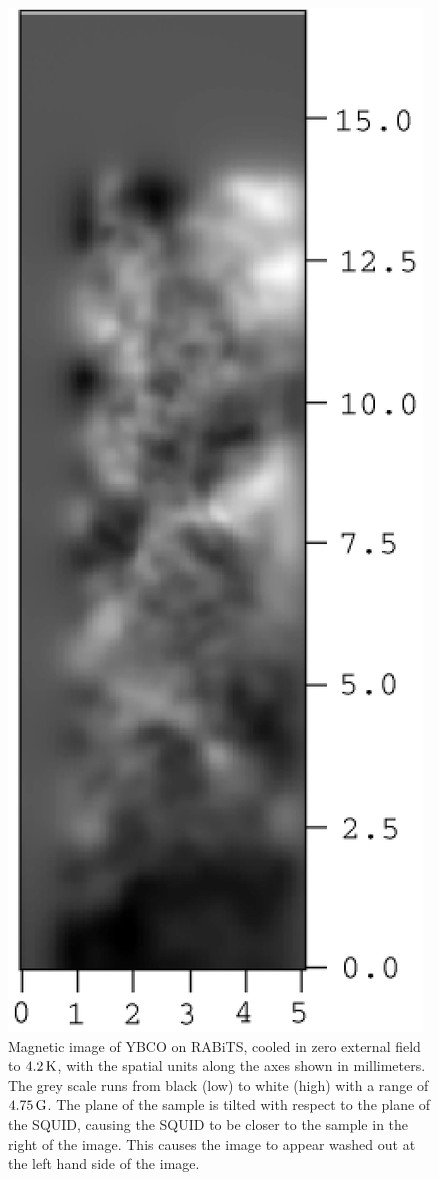 %
%
\begin{figure}[p]
\includegraphics{figs/magpen/fig4.ps}
\caption[Magnetic image of zero field cooled YBCO on RABiTS.]
{Magnetic image of YBCO on RABiTS, cooled in zero external field
to $4.2\,\kelvin$, with the spatial units along the axes shown
in millimeters. 
The grey scale runs from black (low) to white (high) with a 
range of $4.75\,\Gauss$. The plane of the sample is tilted
with respect to the plane of the SQUID, causing the SQUID to 
be closer to the sample in the right of the image. This causes
the image to appear washed out at the left hand side of the image.}
\label{fig:rabits_zfc}
\end{figure}

